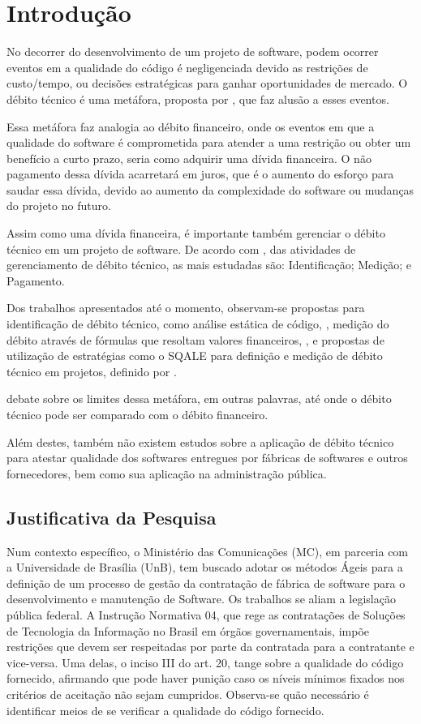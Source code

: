 \chapter[Introdução]{Introdução}

No decorrer do desenvolvimento de um projeto de software, podem ocorrer eventos
em a qualidade do código é negligenciada devido as restrições de custo/tempo,
ou decisões estratégicas para ganhar oportunidades de mercado. O débito técnico
é uma metáfora, proposta por \cite{cunningham}, que faz alusão a esses eventos.

Essa metáfora faz analogia ao débito financeiro, onde os eventos em que a
qualidade do software é comprometida para atender a uma restrição ou obter
um benefício a curto prazo, seria como adquirir uma dívida financeira. O não
pagamento dessa dívida acarretará em juros, que é o aumento do esforço para
saudar essa dívida, devido ao aumento da complexidade do software ou mudanças
do projeto no futuro.

Assim como uma dívida financeira, é importante também gerenciar o débito técnico
em um projeto de software. De acordo com \cite{mapping}, das atividades de
gerenciamento de débito técnico, as mais estudadas são: Identificação; Medição;
e Pagamento.

Dos trabalhos apresentados até o momento, observam-se propostas para identificação de
débito técnico, como análise estática de código, \cite{siebra}, medição do débito
através de fórmulas que resoltam valores financeiros, \cite{principal}, e
propostas de utilização de estratégias como o SQALE para definição e medição de
débito técnico em projetos, definido por \cite{letouzey}.

\cite{schmid} debate sobre os limites dessa metáfora, em outras palavras, até onde
o débito técnico pode ser comparado com o débito financeiro.

Além destes, também não existem estudos sobre a aplicação de débito técnico para
atestar qualidade dos softwares entregues por fábricas de softwares e outros
fornecedores, bem como sua aplicação na administração pública.


\section{Justificativa da Pesquisa}
Num contexto específico, o Ministério das Comunicações (MC), em parceria com a
Universidade de Brasília (UnB), tem buscado adotar os métodos Ágeis para a
definição de um processo de gestão da contratação de fábrica de software para o
desenvolvimento e manutenção de Software.
Os trabalhos se aliam a legislação pública federal. A Instrução Normativa 04,
que rege as contratações de Soluções de Tecnologia da Informação no
 Brasil em órgãos governamentais, impõe restrições que devem ser respeitadas por
 parte da contratada para a contratante e vice-versa. Uma delas, o inciso III do
 art. 20, tange sobre a qualidade do código fornecido, afirmando que pode haver
 punição caso os níveis mínimos fixados nos critérios de aceitação não sejam
 cumpridos. Observa-se quão necessário é identificar meios de se verificar a
 qualidade do código fornecido.

